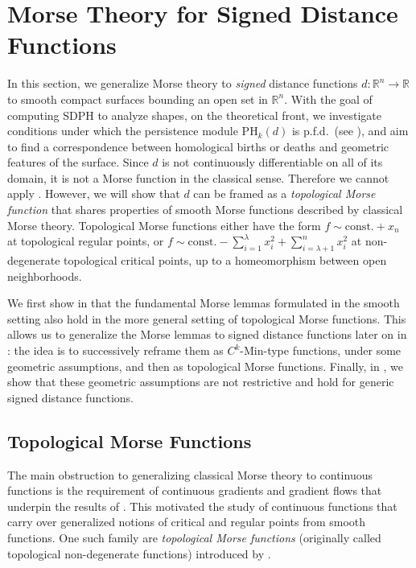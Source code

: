 \documentclass[11pt]{article}
\newcommand{\R}{\mathbb{R}}
\newcommand{\PH}{\mathrm{PH}}
\theoremstyle{plain}
\theoremstyle{definition}
\theoremstyle{remark}
\begin{document}
\section{Morse Theory for Signed Distance Functions}
\label{sec:morse_theory_signdist}

In this section, we generalize Morse theory to \emph{signed} distance functions $d : \R^n \to \R$ to smooth compact surfaces bounding an open set in $\R^n$. With the goal of computing SDPH to analyze shapes, on the theoretical front, we investigate conditions under which the persistence module $\PH_k(d)$ is p.f.d.~(see ), and aim to find a correspondence between homological births or deaths and geometric features of the surface.
Since $d$ is not continuously differentiable on all of its domain, it is not a Morse function in the classical sense. Therefore we cannot apply . 
However, we will show that $d$ can be framed as a \emph{topological Morse function} that shares properties of smooth Morse functions described by classical Morse theory. Topological Morse functions either have the form $f \sim \mathrm{const.} + x_n$ at topological regular points, or $f \sim \mathrm{const.} - \sum_{i = 1}^{\lambda} x_i^2 + \sum_{i = \lambda + 1}^{n} x_i^2$ at non-degenerate topological critical points, up to a homeomorphism between open neighborhoods.

We first show in  that the fundamental Morse lemmas formulated in the smooth setting also hold in the more general setting of topological Morse functions.
This allows us to generalize the Morse lemmas to signed distance functions later on in : the idea is to successively reframe them as $C^k$-Min-type functions, under some geometric assumptions, and then as topological Morse functions.
Finally, in , we show that these geometric assumptions are not restrictive and hold for generic signed distance functions.

\subsection{Topological Morse Functions}
\label{sec:topological_morse_theory}


The main obstruction to generalizing classical Morse theory to continuous functions is the requirement of continuous gradients and gradient flows that underpin the results of . This motivated the study of continuous functions that carry over generalized notions of critical and regular points from smooth functions. One such family are \emph{topological Morse functions} (originally called topological non-degenerate functions) introduced by \cite{morse_topologically_1959}.
\end{document}
